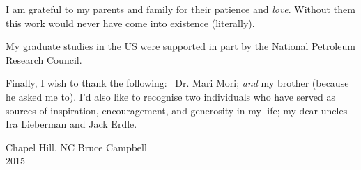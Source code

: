 

\def\baselinestretch{1.0}
 I am grateful to my parents and family for their
patience and {\em love}. Without them this work would never have come into
existence (literally).

My graduate studies in the US were supported in part by the National
Petroleum Research Council.

\medskip
Finally, I wish to thank the following: \,  Dr. Mari Mori; {\em and } my
brother (because he asked me to).   I'd also like to recognise two
individuals who have served as sources of inspiration, encouragement, and
generosity in my life; my dear uncles Ira Lieberman and Jack Erdle.

\bigskip\medskip

\noindent Chapel Hill, NC \hfill Bruce Campbell\\
2015

